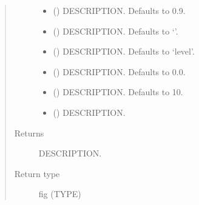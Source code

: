 \documentclass[letterpaper,10pt,english]{sphinxmanual}
\begin{document}
\begin{fulllineitems}
\begin{fulllineitems}
\begin{quote}
\begin{description}
\begin{itemize}
\item {} 
\sphinxAtStartPar
{} (\sphinxstyleliteralemphasis{\sphinxupquote{, }}) \textendash{} DESCRIPTION. Defaults to 0.9.

\item {} 
\sphinxAtStartPar
{} (\sphinxstyleliteralemphasis{\sphinxupquote{, }}) \textendash{} DESCRIPTION. Defaults to ‘’.

\item {} 
\sphinxAtStartPar
{} (\sphinxstyleliteralemphasis{\sphinxupquote{, }}) \textendash{} DESCRIPTION. Defaults to ‘level’.

\item {} 
\sphinxAtStartPar
{} (\sphinxstyleliteralemphasis{\sphinxupquote{, }}) \textendash{} DESCRIPTION. Defaults to 0.0.

\item {} 
\sphinxAtStartPar
{} (\sphinxstyleliteralemphasis{\sphinxupquote{, }}) \textendash{} DESCRIPTION. Defaults to 10.

\item {} 
\sphinxAtStartPar
{} () \textendash{} DESCRIPTION.

\end{itemize}

\item[{Returns}] \leavevmode
\sphinxAtStartPar
DESCRIPTION.

\item[{Return type}] \leavevmode
\sphinxAtStartPar
fig (TYPE)

\end{description}\end{quote}

\end{fulllineitems}


\end{fulllineitems}
\end{document}
